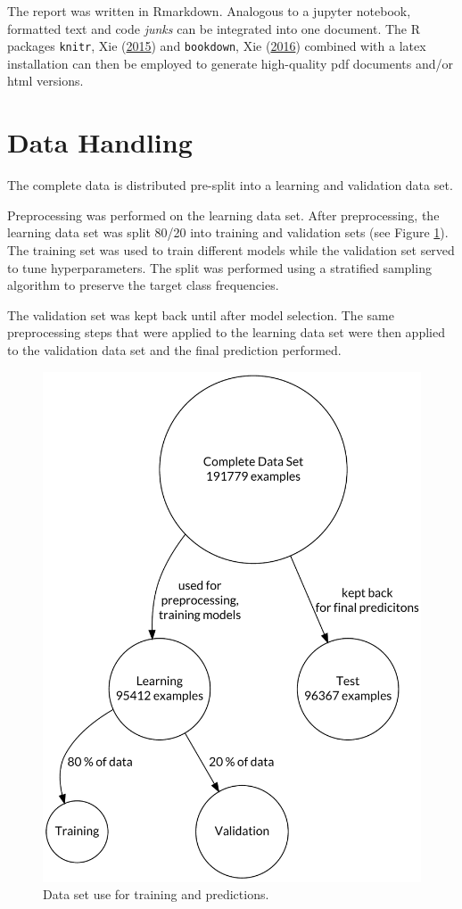 \documentclass[
  11pt,
  a4paper,
  DIV=12,captions=tableheading,oneside]{scrbook}
\begin{document}
The report was written in Rmarkdown. Analogous to a jupyter notebook, formatted text and code \emph{junks} can be integrated into one document. The R packages \texttt{knitr}, Xie (\protect\hyperlink{ref-xie2015}{2015}) and \texttt{bookdown}, Xie (\protect\hyperlink{ref-xie2016bookdown}{2016}) combined with a latex installation can then be employed to generate high-quality pdf documents and/or html versions.

\hypertarget{data-handling}{%
\section{Data Handling}\label{data-handling}}

The complete data is distributed pre-split into a learning and validation data set.

Preprocessing was performed on the learning data set.
After preprocessing, the learning data set was split 80/20 into training and validation sets (see Figure \ref{fig:data-splitting}). The training set was used to train different models while the validation set served to tune hyperparameters. The split was performed using a stratified sampling algorithm to preserve the target class frequencies.

The validation set was kept back until after model selection. The same preprocessing steps that were applied to the learning data set were then applied to the validation data set and the final prediction performed.

\begin{figure}

{\centering \includegraphics[width=0.5\linewidth]{figures/preprocessing/data-splitting} 

}

\caption{Data set use for training and predictions.}\label{fig:data-splitting}
\end{figure}
\end{document}
